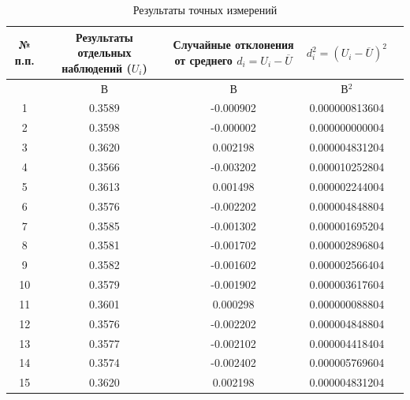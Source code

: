 \begin{center}
\begin{table}[h!]
\centering
\caption{Результаты точных измерений}
\label{tabl:2}
\begin{tabular}{|c|c|c|c|c|}
\hline
\begin{minipage}{7mm}
    № п.п. 
\end{minipage}&
\begin{minipage}{5cm}
    Результаты отдельных наблюдений ($U_i$)
\end{minipage} &
\begin{minipage}{5cm}
    Случайные отклонения от среднего $d_i = U_i - \overline{U}$
\end{minipage} &
\begin{minipage}{5cm}
    $d_i^2 = (U_i - \overline{U})^2$
\end{minipage}\\
\hline
{}&В&В&В$^2$\\
\hline
1 & 0.3589 & -0.000902 & 0.000000813604 \\
2 & 0.3598 & -0.000002 & 0.000000000004 \\
3 & 0.3620 & 0.002198 & 0.000004831204 \\
4 & 0.3566 & -0.003202 & 0.000010252804 \\
5 & 0.3613 & 0.001498 & 0.000002244004 \\
6 & 0.3576 & -0.002202 & 0.000004848804 \\
7 & 0.3585 & -0.001302 & 0.000001695204 \\
8 & 0.3581 & -0.001702 & 0.000002896804 \\
9 & 0.3582 & -0.001602 & 0.000002566404 \\
10 & 0.3579 & -0.001902 & 0.000003617604 \\
11 & 0.3601 & 0.000298 & 0.000000088804 \\
12 & 0.3576 & -0.002202 & 0.000004848804 \\
13 & 0.3577 & -0.002102 & 0.000004418404 \\
14 & 0.3574 & -0.002402 & 0.000005769604 \\
15 & 0.3620 & 0.002198 & 0.000004831204 \\


\hline
\end{tabular}
\end{table}
\end{center}

